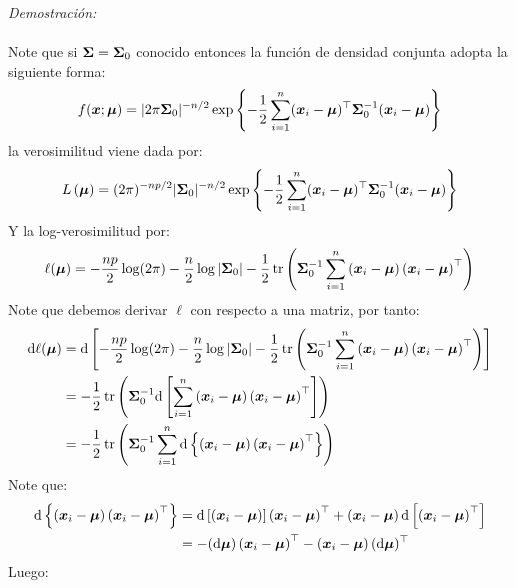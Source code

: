 \emph{Demostración:}\\
\\
Note que si $\bf{\Sigma} =\bf{\Sigma}_0$ conocido entonces la función de densidad conjunta adopta la siguiente forma:
$$
f(\boldsymbol{x};\bf{\mu})=|2 \pi \boldsymbol{\Sigma}_0|^{-n / 2} \exp \left\{-\frac{1}{2}\suma(\boldsymbol{x}_i-\boldsymbol{\mu})^{\top} \boldsymbol{\Sigma}_0^{-1}(\boldsymbol{x}_i-\boldsymbol{\mu})\right\}
$$
la verosimilitud viene dada por:
$$
L\left(\bf{\mu}\right) = (2 \pi)^{-np/2} |\boldsymbol{\Sigma}_0|^{-n / 2} \exp \left\{-\frac{1}{2}\suma(\boldsymbol{x}_i-\boldsymbol{\mu})^{\top} \boldsymbol{\Sigma}_0^{-1}(\boldsymbol{x}_i-\boldsymbol{\mu})\right\}
$$
Y la log-verosimilitud por:
$$
\ell(\boldsymbol{\mu})=-\frac{np}{2}\log(2\pi)-\frac{n}{2} \log |\boldsymbol{\Sigma}_0|-\frac{1}{2} \operatorname{tr}\left( \boldsymbol{\Sigma}_0^{-1}\suma \parcurvo{
\bf{x}_i - \bf{\mu}
}\parcurvo{
\bf{x}_i - \bf{\mu}
}^\top\right)
$$
Note que debemos derivar $\ell$ con respecto a una matriz, por tanto:
\begin{align*}
\de \ell(\bf{\mu}) &= \de\parcerrado{
-\frac{np}{2}\log(2\pi)-\frac{n}{2} \log |\boldsymbol{\Sigma}_0|-\frac{1}{2} \operatorname{tr}\left( \boldsymbol{\Sigma}_0^{-1}\suma \parcurvo{
\bf{x}_i - \bf{\mu}
}\parcurvo{
\bf{x}_i - \bf{\mu}
}^\top\right)
}\\
&=-\dfrac{1}{2} \tr\parcurvo{
\bf{\Sigma}_0^{-1}\de\parcerrado{
\suma \parcurvo{
\bf{x}_i - \bf{\mu}
}\parcurvo{
\bf{x}_i - \bf{\mu}
}^\top
}
}\\
&= - \dfrac{1}{2} \tr\parcurvo{
    \bf{\Sigma}_0^{-1} \suma \de\parllave{
        \parcurvo{
\bf{x}_i - \bf{\mu}
}\parcurvo{
\bf{x}_i - \bf{\mu}
}^\top
    }
}
\end{align*}
Note que:
\begin{align*}
 \de\parllave{
        \parcurvo{
\bf{x}_i - \bf{\mu}
}\parcurvo{
\bf{x}_i - \bf{\mu}
}^\top
    } &= \de\parcerrado{  \parcurvo{
\bf{x}_i - \bf{\mu}
}}\parcurvo{
\bf{x}_i - \bf{\mu}
}^\top + \parcurvo{
\bf{x}_i - \bf{\mu}
}\de\parcerrado{
\parcurvo{
\bf{x}_i - \bf{\mu}
}^\top
}\\
&= -(\de \bf{\mu}) \parcurvo{
\bf{x}_i - \bf{\mu}
}^\top - \parcurvo{
\bf{x}_i - \bf{\mu}
}(\de \bf{\mu})^\top
\end{align*}
Luego:
